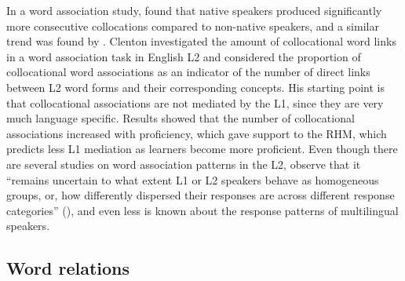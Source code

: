 \documentclass[output=paper,colorlinks,citecolor=brown,nonflat]{langsci/langscibook}
\begin{document}
In a word association study, \citet{Fitzpatrick2006} found that native speakers produced significantly more consecutive collocations compared to non-native speakers, and a similar trend was found by \citet{Clenton2015}. Clenton investigated the amount of collocational word links in a word association task in English L2 and considered the proportion of collocational word associations as an indicator of the number of direct links between L2 word forms and their corresponding concepts. His starting point is that collocational associations are not mediated by the L1, since they are very much language specific. Results showed that the number of collocational associations increased with proficiency, which gave support to the RHM, which predicts less L1 mediation as learners become more proficient. Even though there are several studies on word association patterns in the L2, \citeauthor{CremerEtAl2010} observe that it “remains uncertain to what extent L1 or L2 speakers behave as homogeneous groups, or, how differently dispersed their responses are across different response categories” (\citeyear[188]{CremerEtAl2010}), and even less is known about the response patterns of multilingual speakers.

\subsection{Word relations}\label{sec:gudmundson:1.5}
\end{document}

